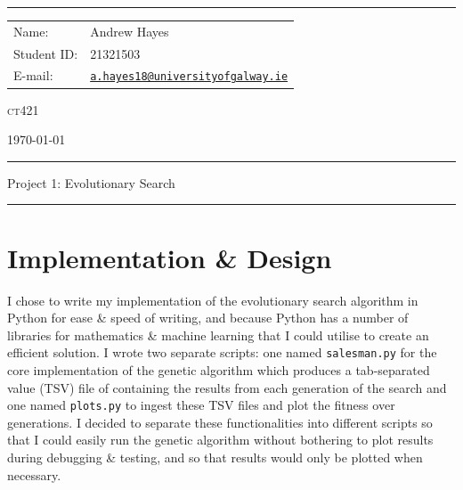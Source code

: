 \documentclass[a4paper]{article}
\begin{document}
\hrule \medskip
\begin{minipage}{0.295\textwidth} 
    \raggedright
    \footnotesize 
    \begin{tabular}{@{}l l}
        Name: & Andrew Hayes \\
        Student ID: & 21321503 \\
        E-mail: & \href{mailto://a.hayes18@universityofgalway.ie}{\texttt{a.hayes18@universityofgalway.ie}} \\
    \end{tabular}
\end{minipage}
\begin{minipage}{0.4\textwidth} 
    \centering 
    \vspace{0.4em}
    \LARGE
    \textsc{ct421} \\ 
\end{minipage}
\begin{minipage}{0.295\textwidth} 
    \raggedleft
    \today
\end{minipage}
\medskip\hrule 
\begin{center}
    \normalsize
    Project 1: Evolutionary Search
\end{center}
\hrule
\medskip

\section{Implementation \& Design}
I chose to write my implementation of the evolutionary search algorithm in Python for ease \& speed of writing, and because Python has a number of libraries for mathematics \& machine learning that I could utilise to create an efficient solution.
I wrote two separate scripts: one named \verb|salesman.py| for the core implementation of the genetic algorithm which produces a tab-separated value (TSV) file of containing the results from each generation of the search and one named \verb|plots.py| to ingest these TSV files and plot the fitness over generations.
I decided to separate these functionalities into different scripts so that I could easily run the genetic algorithm without bothering to plot results during debugging \& testing, and so that results would only be plotted when necessary.
\end{document}
